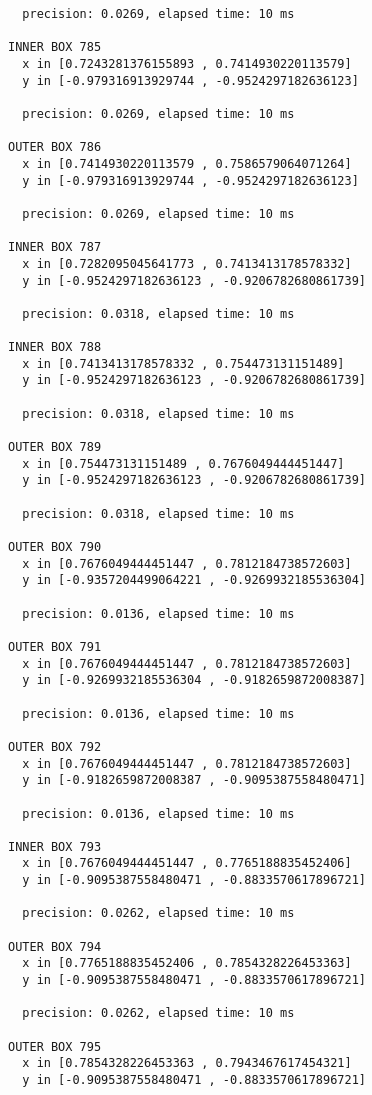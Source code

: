 \begin{verbatim}
  precision: 0.0269, elapsed time: 10 ms

INNER BOX 785
  x in [0.7243281376155893 , 0.7414930220113579]
  y in [-0.979316913929744 , -0.9524297182636123]

  precision: 0.0269, elapsed time: 10 ms

OUTER BOX 786
  x in [0.7414930220113579 , 0.7586579064071264]
  y in [-0.979316913929744 , -0.9524297182636123]

  precision: 0.0269, elapsed time: 10 ms

INNER BOX 787
  x in [0.7282095045641773 , 0.7413413178578332]
  y in [-0.9524297182636123 , -0.9206782680861739]

  precision: 0.0318, elapsed time: 10 ms

INNER BOX 788
  x in [0.7413413178578332 , 0.754473131151489]
  y in [-0.9524297182636123 , -0.9206782680861739]

  precision: 0.0318, elapsed time: 10 ms

OUTER BOX 789
  x in [0.754473131151489 , 0.7676049444451447]
  y in [-0.9524297182636123 , -0.9206782680861739]

  precision: 0.0318, elapsed time: 10 ms

OUTER BOX 790
  x in [0.7676049444451447 , 0.7812184738572603]
  y in [-0.9357204499064221 , -0.9269932185536304]

  precision: 0.0136, elapsed time: 10 ms

OUTER BOX 791
  x in [0.7676049444451447 , 0.7812184738572603]
  y in [-0.9269932185536304 , -0.9182659872008387]

  precision: 0.0136, elapsed time: 10 ms

OUTER BOX 792
  x in [0.7676049444451447 , 0.7812184738572603]
  y in [-0.9182659872008387 , -0.9095387558480471]

  precision: 0.0136, elapsed time: 10 ms

INNER BOX 793
  x in [0.7676049444451447 , 0.7765188835452406]
  y in [-0.9095387558480471 , -0.8833570617896721]

  precision: 0.0262, elapsed time: 10 ms

OUTER BOX 794
  x in [0.7765188835452406 , 0.7854328226453363]
  y in [-0.9095387558480471 , -0.8833570617896721]

  precision: 0.0262, elapsed time: 10 ms

OUTER BOX 795
  x in [0.7854328226453363 , 0.7943467617454321]
  y in [-0.9095387558480471 , -0.8833570617896721]


\end{verbatim}
